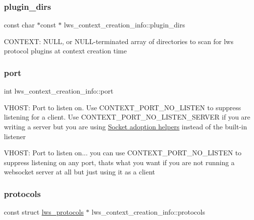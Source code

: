 \subsubsection{\texorpdfstring{plugin\+\_\+dirs}{plugin\_dirs}}
{\footnotesize\ttfamily const char $\ast$const  $\ast$ lws\+\_\+context\+\_\+creation\+\_\+info\+::plugin\+\_\+dirs}

C\+O\+N\+T\+E\+XT\+: N\+U\+LL, or N\+U\+L\+L-\/terminated array of directories to scan for lws protocol plugins at context creation time \mbox{\label{structlws__context__creation__info_a424a5ce268d6903e42243be94487ab85}} 
\subsubsection{\texorpdfstring{port}{port}}
{\footnotesize\ttfamily int lws\+\_\+context\+\_\+creation\+\_\+info\+::port}

V\+H\+O\+ST\+: Port to listen on. Use C\+O\+N\+T\+E\+X\+T\+\_\+\+P\+O\+R\+T\+\_\+\+N\+O\+\_\+\+L\+I\+S\+T\+EN to suppress listening for a client. Use C\+O\+N\+T\+E\+X\+T\+\_\+\+P\+O\+R\+T\+\_\+\+N\+O\+\_\+\+L\+I\+S\+T\+E\+N\+\_\+\+S\+E\+R\+V\+ER if you are writing a server but you are using \hyperlink{group__sock-adopt}{Socket adoption helpers} instead of the built-\/in listener

V\+H\+O\+ST\+: Port to listen on... you can use C\+O\+N\+T\+E\+X\+T\+\_\+\+P\+O\+R\+T\+\_\+\+N\+O\+\_\+\+L\+I\+S\+T\+EN to suppress listening on any port, that\textquotesingle{}s what you want if you are not running a websocket server at all but just using it as a client \mbox{\label{structlws__context__creation__info_a2f2b38d90864e3cdea64b5ebc7ecba8d}} 
\subsubsection{\texorpdfstring{protocols}{protocols}}
{\footnotesize\ttfamily const struct \hyperlink{structlws__protocols}{lws\+\_\+protocols} $\ast$ lws\+\_\+context\+\_\+creation\+\_\+info\+::protocols}


